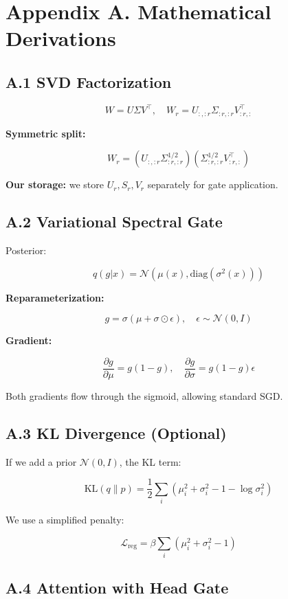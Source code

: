 \section{Appendix A. Mathematical Derivations}

\subsection{A.1 SVD Factorization}

\[
W = U \Sigma V^\top, \quad W_r = U_{:, :r} \Sigma_{:r, :r} V_{:r, :}^\top
\tag{A.1}
\]

\textbf{Symmetric split:}

\[
W_r = (U_{:, :r} \Sigma_{:r, :r}^{1/2}) (\Sigma_{:r, :r}^{1/2} V_{:r, :}^\top)
\tag{A.2}
\]

\textbf{Our storage:} we store $U_r, S_r, V_r$ separately for gate application.

\subsection{A.2 Variational Spectral Gate}

Posterior:

\[
q(g | x) = \mathcal{N}(\mu(x), \text{diag}(\sigma^2(x)))
\tag{A.3}
\]

\textbf{Reparameterization:}

\[
g = \sigma(\mu + \sigma \odot \epsilon), \quad \epsilon \sim \mathcal{N}(0, I)
\tag{A.4}
\]

\textbf{Gradient:}

\[
\frac{\partial g}{\partial \mu} = g(1 - g), \quad
\frac{\partial g}{\partial \sigma} = g(1 - g) \epsilon
\tag{A.5}
\]

Both gradients flow through the sigmoid, allowing standard SGD.

\subsection{A.3 KL Divergence (Optional)}

If we add a prior $\mathcal{N}(0, I)$, the KL term:

\[
\text{KL}(q \| p) = \frac{1}{2} \sum_i \left(\mu_i^2 + \sigma_i^2 - 1 - \log \sigma_i^2\right)
\tag{A.6}
\]

We use a simplified penalty:

\[
\mathcal{L}_\text{reg} = \beta \sum_i (\mu_i^2 + \sigma_i^2 - 1)
\tag{A.7}
\]

\subsection{A.4 Attention with Head Gate}

